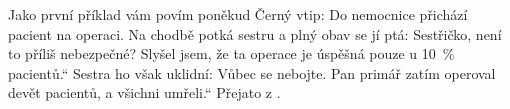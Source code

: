 \begin{mdframed}[style=mdexam]
  \begin{example}\label{mai:exam102}
    Jako první příklad vám povím poněkud Černý vtip: \newline
    Do nemocnice přichází pacient na operaci. Na chodbě potká sestru a plný obav se jí ptá:
    Sestřičko, není to příliš nebezpečné? Slyšel jsem, že ta operace je úspěšná pouze u
    \qty{10}{\percent} pacientů.“ Sestra ho však uklidní: Vůbec se nebojte. Pan primář zatím operoval
    devět pacientů, a všichni umřeli.“ Přejato z \cite[s.~9]{Rogalewicz2007}.
  \end{example}
\end{mdframed}
